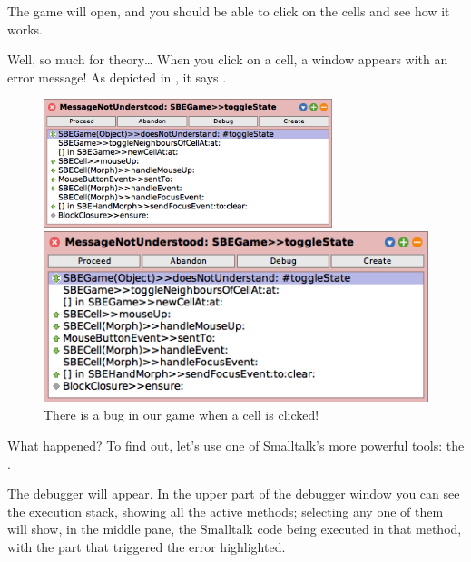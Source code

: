 \documentclass[a4paper,10pt,twoside]{book}
\begin{document}

The game will open, and you should be able to click on the cells and see how it works.

Well, so much for theory\ldots{}
When you click on a cell, a  window appears with an error message!
As depicted in , it says .

\begin{figure}[ht]
\ifluluelse
	{\centerline{\includegraphics[width=0.75\textwidth]{Error}}}
	{\centerline{\includegraphics[scale=0.7]{Error}}}
\caption{There is a bug in our game when a cell is clicked!
\label{fig:quintoError}}
\end{figure}

\noindent
What happened?
To find out, let's use one of Smalltalk's more powerful tools: the .

The debugger will appear.
In the upper part of the debugger window you can see the execution stack, showing all the active methods; selecting any one of them will show, in the middle pane, the Smalltalk code being executed in that method, with the part that triggered the error highlighted.
\end{document}
